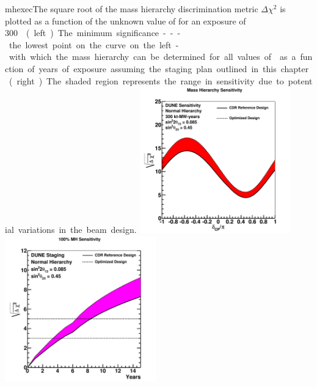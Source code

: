 \begin{cdrfigure}{mhexec}{The
    square root of the mass hierarchy discrimination metric $\Delta
    \chi^2$ is plotted as a function of the unknown value of \deltacp
    for an exposure of \SI{300}\ktMWyr{} %
    (left).  The minimum significance
    --- the lowest point on the curve on the left - with which the mass
    hierarchy can be determined for all values of \deltacp as a
    function of years of exposure assuming the staging plan outlined in this chapter (right).
    The shaded region represents the range in sensitivity due to
    potential variations in the beam design.}
\includegraphics[width=0.49\textwidth]{volume-physics/figures/mh_300ktmwyear}
\includegraphics[width=0.49\textwidth]{volume-physics/figures/mh_exp_staging15yr}
\label{fig:mhexec}
\end{cdrfigure}

